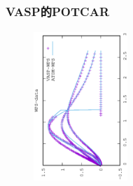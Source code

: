 {\frame
{
	\frametitle{\rm{VASP}的\rm{POTCAR}}
\begin{minipage}{0.58\textwidth}
\centering
\vspace{-0.10in}
\fontsize{3.3pt}{1.9pt}\selectfont{
}
\end{minipage}
\hfill
\begin{minipage}{0.40\textwidth}
\begin{figure}[t!]
\centering
\vspace{-0.05in}
\includegraphics[height=2.25in,width=1.4in,viewport=0 0 350 550, angle=-90, clip]{Figures/WPS-data.eps}
\label{Wave-PS_Function}
\end{figure}
\end{minipage}
}

}
